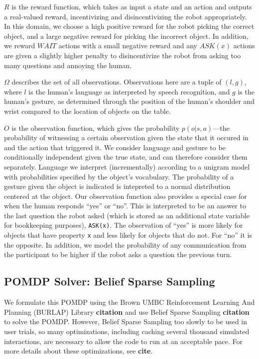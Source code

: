 \documentclass{article}
\begin{document}
$R$ is the reward function, which takes as input a state and an action and outputs a real-valued reward, incentivizing and disincentivizing the robot appropriately. In this domain, we choose a high positive reward for the robot picking the correct object, and a large negative reward for picking the incorrect object. In addition, we reward $WAIT$ actions with a small negative reward and any $ASK(x)$ actions are given a slightly higher penalty to disincentivize the robot from asking too many questions and annoying the human. 

$\Omega$ describes the set of all observations. Observations here are a tuple of $(l,g)$, where $l$ is the human's language as interpreted by speech recognition, and $g$ is the human's gesture, as determined through the position of the human's shoulder and wrist compared to the location of objects on the table. 

$O$ is the observation function, which gives the probability $p(o|s, a)$---the probability of witnessing a certain observation given the state that it occured in and the action that triggered it. We consider language and gesture to be conditionally independent given the true state, and can therefore consider them separately. Language we interpret (incrementally) according to a unigram model with probabilities specified by the object's vocabulary. The probability of a gesture given the object is indicated is intepreted to a normal distribution centered at the object. Our observation function also provides a special case for when the human responds ``yes'' or ``no''. This is interpreted to be an answer to the last question the robot asked (which is stored as an additional state variable for bookkeeping purposes), \texttt{ASK(x)}. The observation of ``yes'' is more likely for objects that have property \texttt{x} and less likely for objects that do not. For ``no'' it is the opposite. In addition, we model the probability of any communication from the participant to be higher if the robot asks a question the previous turn. 

\subsection{POMDP Solver: Belief Sparse Sampling}

We formulate this POMDP using the Brown UMBC Reinforcement Learning And Planning (BURLAP) Library \textbf{citation} and use Belief Sparse Sampling \textbf{citation} to solve the POMDP. However, Belief Sparse Sampling too slowly to be used in user trials, so many optimizations, including caching several thousand simulated interactions, are necessary to allow the code to run at an acceptable pace. For more details about these optimizations, see \textbf{cite}. 
\end{document}
